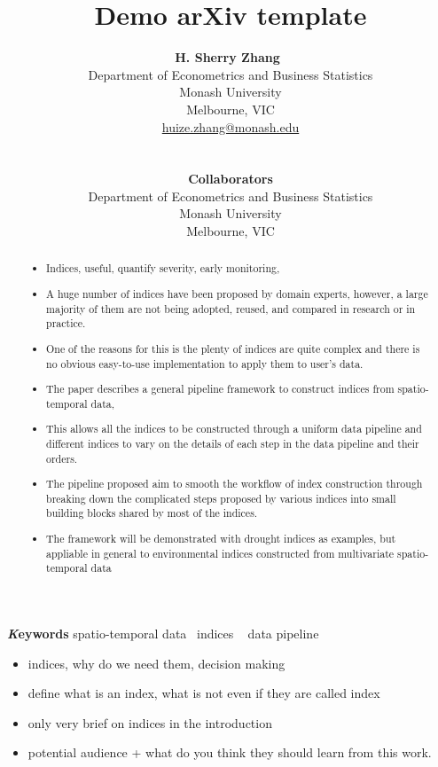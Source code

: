\documentclass[
]{article}
\title{Demo arXiv template}
\author{
\textbf{H. Sherry Zhang}~\orcidlink{0000-0002-7122-1463}\\Department of
Econometrics and Business Statistics\\Monash University\\Melbourne,
VIC\\\href{mailto:huize.zhang@monash.edu}{huize.zhang@monash.edu}\\\\\\
\textbf{Collaborators}\\Department of Econometrics and Business
Statistics\\Monash University\\Melbourne, VIC\\}
\date{}
\providecommand{\tightlist}{%
  \setlength{\itemsep}{0pt}\setlength{\parskip}{0pt}}\usepackage{longtable,booktabs,array}
\begin{document}
\maketitle
\begin{abstract}
\begin{itemize}
\tightlist
\item
  Indices, useful, quantify severity, early monitoring,
\item
  A huge number of indices have been proposed by domain experts,
  however, a large majority of them are not being adopted, reused, and
  compared in research or in practice.
\item
  One of the reasons for this is the plenty of indices are quite complex
  and there is no obvious easy-to-use implementation to apply them to
  user's data.
\item
  The paper describes a general pipeline framework to construct indices
  from spatio-temporal data,
\item
  This allows all the indices to be constructed through a uniform data
  pipeline and different indices to vary on the details of each step in
  the data pipeline and their orders.
\item
  The pipeline proposed aim to smooth the workflow of index construction
  through breaking down the complicated steps proposed by various
  indices into small building blocks shared by most of the indices.
\item
  The framework will be demonstrated with drought indices as examples,
  but appliable in general to environmental indices constructed from
  multivariate spatio-temporal data
\end{itemize}
\end{abstract}
{\bfseries \emph Keywords}
\def\sep{\textbullet\ }
spatio-temporal data \sep indices \sep 
data pipeline

\ifdefined\Shaded\renewenvironment{Shaded}{\begin{tcolorbox}[borderline west={3pt}{0pt}{shadecolor}, enhanced, sharp corners, breakable, boxrule=0pt, interior hidden, frame hidden]}{\end{tcolorbox}}\fi

\begin{itemize}
\tightlist
\item
  indices, why do we need them, decision making
\item
  define what is an index, what is not even if they are called index
\item
  only very brief on indices in the introduction
\item
  potential audience + what do you think they should learn from this
  work.
\end{itemize}
\end{document}
